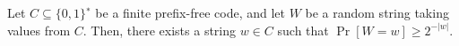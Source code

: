 Let $C \subseteq \{0, 1\}^∗$ be a finite prefix-free code, and let $W$ be a random string taking values
from $C$. Then, there exists a string $w \in C$ such that $\Pr[W = w] \ge 2^{-|w|}$.